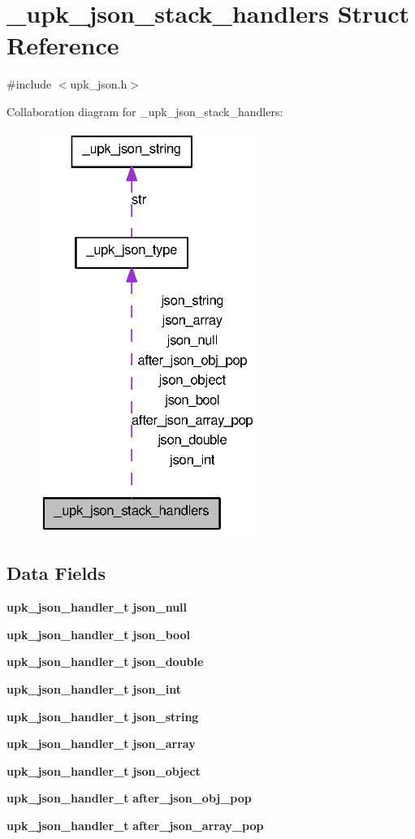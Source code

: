 \section{\_\-upk\_\-json\_\-stack\_\-handlers Struct Reference}
\label{struct__upk__json__stack__handlers}


{\ttfamily \#include $<$upk\_\-json.h$>$}



Collaboration diagram for \_\-upk\_\-json\_\-stack\_\-handlers:\nopagebreak
\begin{figure}[H]
\begin{center}
\leavevmode
\includegraphics[width=201pt]{struct__upk__json__stack__handlers__coll__graph}
\end{center}
\end{figure}
\subsection*{Data Fields}
\begin{DoxyCompactItemize}
\item 
{\bf upk\_\-json\_\-handler\_\-t} {\bf json\_\-null}
\item 
{\bf upk\_\-json\_\-handler\_\-t} {\bf json\_\-bool}
\item 
{\bf upk\_\-json\_\-handler\_\-t} {\bf json\_\-double}
\item 
{\bf upk\_\-json\_\-handler\_\-t} {\bf json\_\-int}
\item 
{\bf upk\_\-json\_\-handler\_\-t} {\bf json\_\-string}
\item 
{\bf upk\_\-json\_\-handler\_\-t} {\bf json\_\-array}
\item 
{\bf upk\_\-json\_\-handler\_\-t} {\bf json\_\-object}
\item 
{\bf upk\_\-json\_\-handler\_\-t} {\bf after\_\-json\_\-obj\_\-pop}
\item 
{\bf upk\_\-json\_\-handler\_\-t} {\bf after\_\-json\_\-array\_\-pop}
\end{DoxyCompactItemize}


